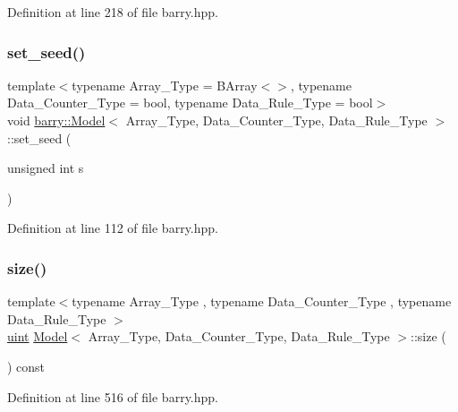 Definition at line 218 of file barry.\+hpp.

\mbox{\label{classbarry_1_1_model_a175a1772d843dedd603f6bb572cfa30a}} 
\subsubsection{\texorpdfstring{set\+\_\+seed()}{set\_seed()}}
{\footnotesize\ttfamily template$<$typename Array\+\_\+\+Type  = B\+Array$<$$>$, typename Data\+\_\+\+Counter\+\_\+\+Type  = bool, typename Data\+\_\+\+Rule\+\_\+\+Type  = bool$>$ \\
void \hyperlink{classbarry_1_1_model}{barry\+::\+Model}$<$ Array\+\_\+\+Type, Data\+\_\+\+Counter\+\_\+\+Type, Data\+\_\+\+Rule\+\_\+\+Type $>$\+::set\+\_\+seed (\begin{DoxyParamCaption}\item[{unsigned int}]{s }\end{DoxyParamCaption})\hspace{0.3cm}{\ttfamily [inline]}}



Definition at line 112 of file barry.\+hpp.

\mbox{\label{classbarry_1_1_model_ab3f157dbb542a48fe5bf412ff7d467fd}} 
\subsubsection{\texorpdfstring{size()}{size()}}
{\footnotesize\ttfamily template$<$typename Array\+\_\+\+Type , typename Data\+\_\+\+Counter\+\_\+\+Type , typename Data\+\_\+\+Rule\+\_\+\+Type $>$ \\
\hyperlink{namespacebarry_a11dfc53ddb4672278319aa04f1e09a6c}{uint} \hyperlink{classbarry_1_1_model}{Model}$<$ Array\+\_\+\+Type, Data\+\_\+\+Counter\+\_\+\+Type, Data\+\_\+\+Rule\+\_\+\+Type $>$\+::size (\begin{DoxyParamCaption}{ }\end{DoxyParamCaption}) const\hspace{0.3cm}{\ttfamily [inline]}}



Definition at line 516 of file barry.\+hpp.

